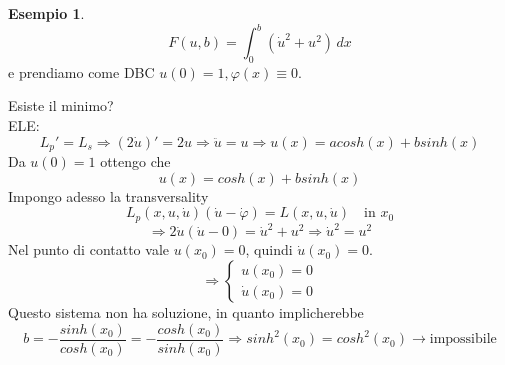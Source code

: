 \documentclass[a4paper]{book}
\theoremstyle{definition}
\newtheorem{ex}{Esempio}
\theoremstyle{remark}
\theoremstyle{definition}
\newcommand{\ra}{\Rightarrow}
\begin{document}
\begin{ex}
\[
	F(u, b) = \int_{0}^{b}(\dot{u}^2 + u^2)\, dx
\]
e prendiamo come DBC $u(0) = 1, \varphi(x)\equiv 0 $.\\

Esiste il minimo?\\
ELE: $$L_p' = L_s \ra (2\dot{u})' = 2u \ra \ddot{u} = u \ra u(x) = a cosh(x) + b sinh(x)$$
Da $u(0) = 1$ ottengo che 
\[
	u(x) = cosh(x) + bsinh(x)
\]
Impongo adesso la transversality
\[
	L_p(x, u, \dot{u}) (\dot{u} - \dot{\varphi} ) = L(x, u, \dot{u})\quad\text{in }x_0	
\]
\[
	\ra 2\dot{u}(\dot{u} - 0) = \dot{u}^2 + u^2 \ra \dot{u}^2 = u^2
\]
Nel punto di contatto vale $u(x_0) = 0$, quindi $\dot{u}(x_0)=0$.
\[
 	\ra 
 	\begin{cases}
 	u(x_0) = 0 \\
 	\dot{u}(x_0) = 0
 	\end{cases}
 \] 
 Questo sistema non ha soluzione, in quanto implicherebbe
 \[
 	b = - \frac{sinh(x_0)}{cosh(x_0)} = -\frac{cosh(x_0)}{sinh(x_0)} \ra sinh^2(x_0) = cosh^2(x_0)\to \text{impossibile}
 \]
\end{ex}
\end{document}
